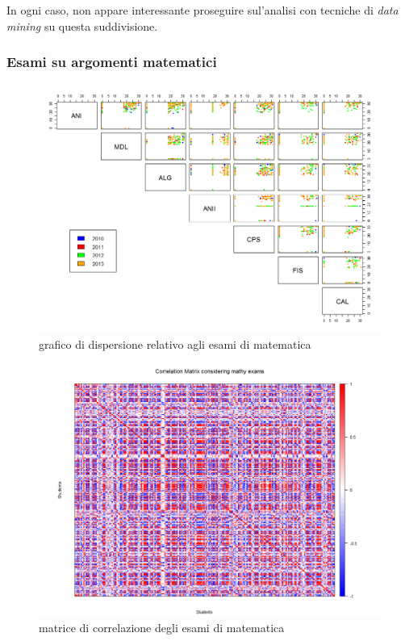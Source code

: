                 In ogni caso, non appare interessante proseguire sul'analisi con tecniche di \textit{data mining} su questa suddivisione.

            \subsubsection{Esami su argomenti matematici}

                \begin{figure}
                    \centering
                    \caption{grafico di dispersione relativo agli esami di matematica}
                    \label{esami_mat}
                	\includegraphics[scale=0.32]{img/scatter_plot_8_gen.png}
                \end{figure}

                \begin{figure}
                    \centering
                    \caption{matrice di correlazione degli esami di matematica}
                    \label{esami_mat_corr}
                	\includegraphics[scale=0.32]{img/corr_matrix_3.png}
                \end{figure}

